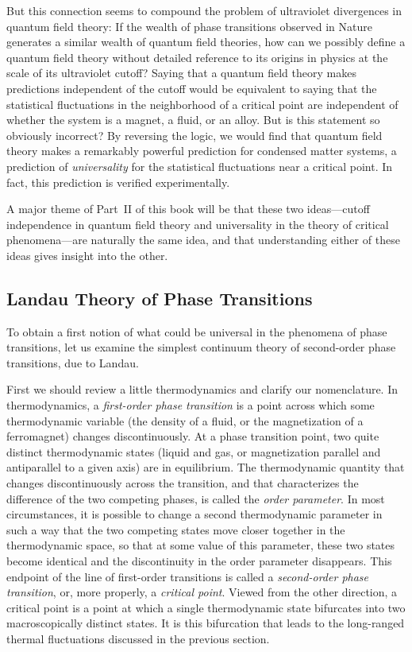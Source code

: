 But this connection seems to compound the problem of ultraviolet divergences
in quantum field theory: If the wealth of phase transitions observed in Nature
generates a similar wealth of quantum field theories, how can we possibly
define a quantum field theory without detailed reference to its origins in
physics at the scale of its ultraviolet cutoff?  Saying that a quantum field
theory makes predictions independent of the cutoff would be equivalent to
saying that the statistical fluctuations in the neighborhood of a critical
point are independent of whether the system is a magnet, a fluid, or an alloy.
But is this statement so obviously incorrect?  By reversing the logic, we
would find that quantum field theory makes a remarkably powerful prediction
for condensed matter systems, a prediction of \emph{universality} for the
statistical fluctuations near a critical point.  In fact, this prediction is
verified experimentally.

A major theme of Part~II of this book will be that these two ideas---cutoff
independence in quantum field theory and universality in the theory of
critical phenomena---are naturally the same idea, and that understanding
either of these ideas gives insight into the other.

\subsection*{Landau Theory of Phase Transitions}

To obtain a first notion of what could be universal in the phenomena of phase
transitions, let us examine the simplest continuum theory of second-order
phase transitions, due to Landau.

First we should review a little thermodynamics and clarify our nomenclature.
In thermodynamics, a \emph{first-order phase transition} is a point across
which some thermodynamic variable (the density of a fluid, or the
magnetization of a ferromagnet) changes discontinuously.  At a phase
transition point, two quite distinct thermodynamic states (liquid and gas, or
magnetization parallel and antiparallel to a given axis) are in equilibrium.
The thermodynamic quantity that changes discontinuously across the
transition, and that characterizes the difference of the two competing phases,
is called the \emph{order parameter}.  In most circumstances, it is possible
to change a second thermodynamic parameter in such a way that the two
competing states move closer together in the thermodynamic space, so that at
some value of this parameter, these two states become identical and the
discontinuity in the order parameter disappears.  This endpoint of the line of
first-order transitions is called a \emph{second-order phase transition}, or,
more properly, a \emph{critical point}.  Viewed from the other direction, a
critical point is a point at which a single thermodynamic state bifurcates
into two macroscopically distinct states.  It is this bifurcation that leads
to the long-ranged thermal fluctuations discussed in the previous section.


